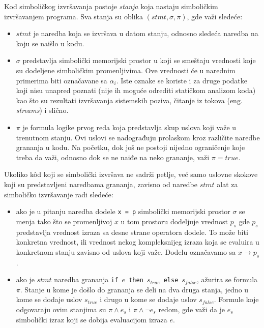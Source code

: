 \documentclass[12pt,oneside]{memoir}
\begin{document}
Kod simboličkog izvršavanja postoje \textit{stanja} koja nastaju simboličkim izvršavanjem programa. Sva stanja su oblika $(stmt, \sigma, \pi)$, gde važi sledeće:

\begin{itemize}
    \item $stmt$ je naredba koja se izvršava u datom stanju, odnosno sledeća naredba na koju se naišlo u kodu.
    \item $\sigma$ predstavlja simbolički memorijski prostor u koji se smeštaju vrednosti koje su dodeljene simboličkim promenljivima. Ove vrednosti će u narednim primerima biti označavane sa $\alpha_i$. Iste oznake se koriste i za druge podatke koji nisu unapred poznati (nije ih moguće odrediti statičkom analizom koda) kao što su rezultati izvršavanja sistemskih poziva, čitanje iz tokova (eng. \textit{streams}) i slično.
    
    \item $\pi$ je formula logike prvog reda koja predstavlja skup uslova koji važe u trenutnom stanju. Ovi uslovi se nadograđuju prolaskom kroz različite naredbe grananja u kodu. Na početku, dok još ne postoji nijedno ograničenje koje treba da važi, odnosno dok se ne naiđe na neko grananje, važi $\pi = true$. 
\end{itemize}

Ukoliko k\^od koji se simbolički izvršava ne sadrži petlje, već samo uslovne skokove koji su predstavljeni naredbama grananja, zavisno od naredbe $stmt$ alat za simboličko izvršavanje radi sledeće:

\begin{itemize}
    \item ako je u pitanju naredba dodele \texttt{x = p} simbolički memorijski prostor $\sigma$ se menja tako što se promenljivoj $x$ u tom prostoru dodeljuje vrednost $p_s$ gde $p_s$ predstavlja vrednost izraza sa desne strane operatora dodele. To može biti konkretna vrednost, ili vrednost nekog kompleksnijeg izraza koja se evaluira u konkretnom stanju zavisno od uslova koji važe. Dodelu označavamo sa $x \rightarrow p_s$.
    
    \item ako je $stmt$ naredba grananja \texttt{if $e$ then $s_{true}$ else $s_{false}$}, ažurira se formula $\pi$. Stanje u kome je došlo do grananja se deli na dva druga stanja, jedno u kome se dodaje uslov $s_{true}$ i drugo u kome se dodaje uslov $s_{false}$. Formule koje odgovaraju ovim stanjima su $\pi \land e_s$ i $\pi \land \neg e_s$ redom, gde važi da je $e_s$ simbolički izraz koji se dobija evaluacijom izraza $e$.
\end{itemize}
\end{document}
